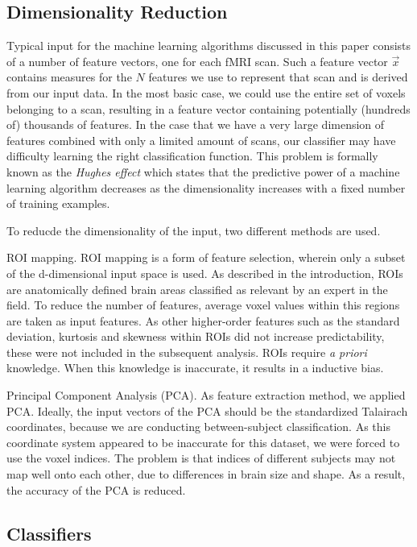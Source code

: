 \documentclass[preprint,journal,11pt]{vgtc}
\begin{document}
\subsection{Dimensionality Reduction}
Typical input for the machine learning algorithms discussed in this paper consists of a number of feature vectors, one for each fMRI scan. Such a feature vector $\vec{x}$ contains measures for the $N$ features we use to represent that scan and is derived from our input data. In the most basic case, we could use the entire set of voxels belonging to a scan, resulting in a feature vector containing potentially (hundreds of) thousands of features.
In the case that we have a very large dimension of features combined with only a limited amount of scans, our classifier may have difficulty learning the right classification function. This problem is formally known as the \textit{Hughes effect}\cite{Hughes1054102} which states that the predictive power of a machine learning algorithm decreases as the dimensionality increases with a fixed number of training examples.

To reducde the dimensionality of the input, two different methods are used.

ROI mapping. ROI mapping is a form of feature selection, wherein only a subset of the d-dimensional input space is used. As described in the introduction, ROIs are anatomically defined brain areas classified as relevant by an expert in the field. To reduce the number of features, average voxel values within this regions are taken as input features. As other higher-order features such as the standard deviation, kurtosis and skewness within ROIs did not increase predictability, these were not included in the subsequent analysis. ROIs require \textit{a priori} knowledge. When this knowledge is inaccurate, it results in a inductive bias.

Principal Component Analysis (PCA). As feature extraction method, we applied PCA. Ideally, the input vectors of the PCA should be the standardized Talairach coordinates, because we are conducting between-subject classification. As this coordinate system appeared to be inaccurate for this dataset, we were forced to use the voxel indices. The problem is that indices of different subjects may not map well onto each other, due to differences in brain size and shape. As a result, the accuracy of the PCA is reduced.   


\subsection{Classifiers}
\end{document}
